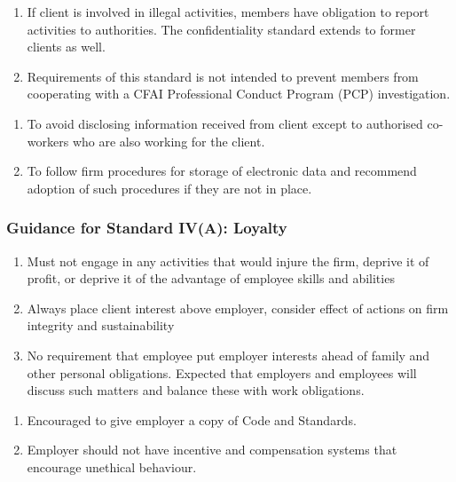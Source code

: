 \begin{remark} 
\begin{enumerate}[label=\roman*.]
\setlength{\itemsep}{0pt}
\item If client is involved in illegal activities, members have obligation to report activities to authorities. The confidentiality standard extends to former clients as well.
\item Requirements of this standard is not intended to prevent members from cooperating with a CFAI Professional Conduct Program (PCP) investigation.
\end{enumerate}
\end{remark}

\begin{remark} 
\begin{enumerate}[label=\roman*.]
\setlength{\itemsep}{0pt}
\item To avoid disclosing information received from client except to authorised co-workers who are also working for the client.
\item To follow firm procedures for storage of electronic data and recommend adoption of such procedures if they are not in place.
\end{enumerate}
\end{remark}

\subsubsection{Guidance for Standard IV(A): Loyalty}

\begin{remark} 
\begin{enumerate}[label=\roman*.]
\setlength{\itemsep}{0pt}
\item Must not engage in any activities that would injure the firm, deprive it of profit, or deprive it of the advantage of employee skills and abilities
\item Always place client interest above employer, consider effect of actions on firm integrity and sustainability
\item No requirement that employee put employer interests ahead of family and other personal obligations. Expected that employers and employees will discuss such matters and balance these with work obligations.
\end{enumerate}
\end{remark}

\begin{remark} 
\begin{enumerate}[label=\roman*.]
\setlength{\itemsep}{0pt}
\item Encouraged to give employer a copy of Code and Standards.\\
\item Employer should not have incentive and compensation systems that encourage unethical behaviour.
\end{enumerate}
\end{remark}

